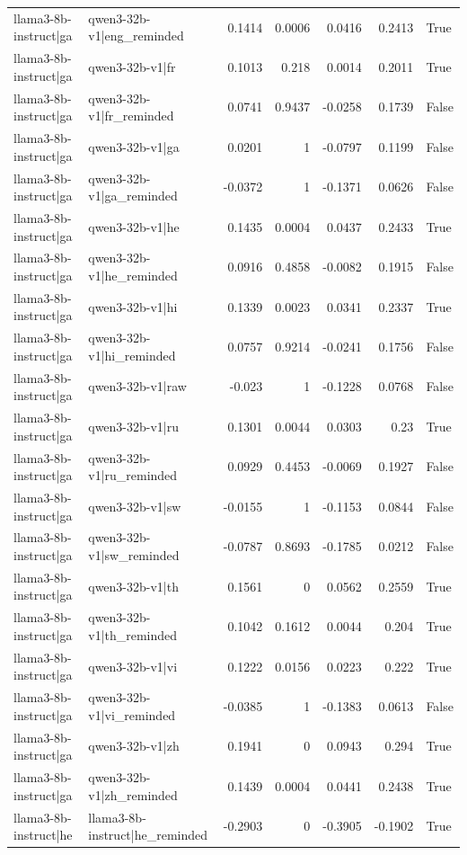 \begin{table}
\begin{tabular}{l l r r r r l}
llama3-8b-instruct|ga & qwen3-32b-v1|eng_reminded & 0.1414 & 0.0006 & 0.0416 & 0.2413 & True \\
llama3-8b-instruct|ga & qwen3-32b-v1|fr & 0.1013 & 0.218 & 0.0014 & 0.2011 & True \\
llama3-8b-instruct|ga & qwen3-32b-v1|fr_reminded & 0.0741 & 0.9437 & -0.0258 & 0.1739 & False \\
llama3-8b-instruct|ga & qwen3-32b-v1|ga & 0.0201 & 1 & -0.0797 & 0.1199 & False \\
llama3-8b-instruct|ga & qwen3-32b-v1|ga_reminded & -0.0372 & 1 & -0.1371 & 0.0626 & False \\
llama3-8b-instruct|ga & qwen3-32b-v1|he & 0.1435 & 0.0004 & 0.0437 & 0.2433 & True \\
llama3-8b-instruct|ga & qwen3-32b-v1|he_reminded & 0.0916 & 0.4858 & -0.0082 & 0.1915 & False \\
llama3-8b-instruct|ga & qwen3-32b-v1|hi & 0.1339 & 0.0023 & 0.0341 & 0.2337 & True \\
llama3-8b-instruct|ga & qwen3-32b-v1|hi_reminded & 0.0757 & 0.9214 & -0.0241 & 0.1756 & False \\
llama3-8b-instruct|ga & qwen3-32b-v1|raw & -0.023 & 1 & -0.1228 & 0.0768 & False \\
llama3-8b-instruct|ga & qwen3-32b-v1|ru & 0.1301 & 0.0044 & 0.0303 & 0.23 & True \\
llama3-8b-instruct|ga & qwen3-32b-v1|ru_reminded & 0.0929 & 0.4453 & -0.0069 & 0.1927 & False \\
llama3-8b-instruct|ga & qwen3-32b-v1|sw & -0.0155 & 1 & -0.1153 & 0.0844 & False \\
llama3-8b-instruct|ga & qwen3-32b-v1|sw_reminded & -0.0787 & 0.8693 & -0.1785 & 0.0212 & False \\
llama3-8b-instruct|ga & qwen3-32b-v1|th & 0.1561 & 0 & 0.0562 & 0.2559 & True \\
llama3-8b-instruct|ga & qwen3-32b-v1|th_reminded & 0.1042 & 0.1612 & 0.0044 & 0.204 & True \\
llama3-8b-instruct|ga & qwen3-32b-v1|vi & 0.1222 & 0.0156 & 0.0223 & 0.222 & True \\
llama3-8b-instruct|ga & qwen3-32b-v1|vi_reminded & -0.0385 & 1 & -0.1383 & 0.0613 & False \\
llama3-8b-instruct|ga & qwen3-32b-v1|zh & 0.1941 & 0 & 0.0943 & 0.294 & True \\
llama3-8b-instruct|ga & qwen3-32b-v1|zh_reminded & 0.1439 & 0.0004 & 0.0441 & 0.2438 & True \\
llama3-8b-instruct|he & llama3-8b-instruct|he_reminded & -0.2903 & 0 & -0.3905 & -0.1902 & True \\

\end{tabular}
\end{table}
